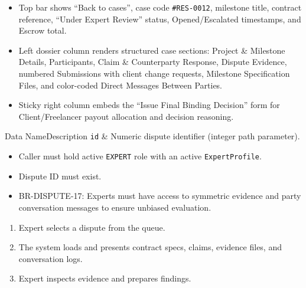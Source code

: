 \begin{itemize}[leftmargin=1.6em,topsep=3pt,itemsep=2pt,parsep=0pt,label=$\bullet$]
      \item Top bar shows ``Back to cases'', case code \texttt{\#RES-0012}, milestone title, contract reference, ``Under Expert Review'' status, Opened/Escalated timestamps, and Escrow total.
      \item Left dossier column renders structured case sections: Project \& Milestone Details, Participants, Claim \& Counterparty Response, Dispute Evidence, numbered Submissions with client change requests, Milestone Specification Files, and color-coded Direct Messages Between Parties.
      \item Sticky right column embeds the ``Issue Final Binding Decision'' form for Client/Freelancer payout allocation and decision reasoning.
\end{itemize}


\begin{specdatatable}{Data Name}{Description}
      \texttt{id} & Numeric dispute identifier (integer path parameter).\\ \hline
\end{specdatatable}

\begin{itemize}[leftmargin=1.6em,topsep=3pt,itemsep=2pt,parsep=0pt,label=$\bullet$]
      \item Caller must hold active \texttt{EXPERT} role with an active \texttt{ExpertProfile}.
      \item Dispute ID must exist.
\end{itemize}

\begin{itemize}[leftmargin=1.6em,topsep=3pt,itemsep=2pt,parsep=0pt,label=$\bullet$]\brrulelist
      \item BR-DISPUTE-17: Experts must have access to symmetric evidence and party conversation messages to ensure unbiased evaluation.
\end{itemize}

\begin{enumerate}[leftmargin=1.8em,topsep=3pt,itemsep=2pt,parsep=0pt]
      \item Expert selects a dispute from the queue.
      \item The system loads and presents contract specs, claims, evidence files, and conversation logs.
      \item Expert inspects evidence and prepares findings.
\end{enumerate}

